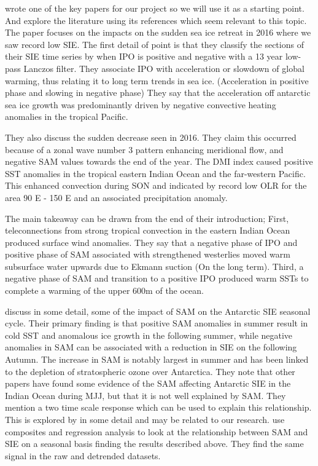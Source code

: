 \cite{Meehl2019Sustained2016} wrote one of the key papers for our project so we will use it as a starting point. And explore the literature using its references which seem relevant to this topic. The paper focuses on the impacts on the sudden sea ice retreat in 2016 where we saw record low SIE. The first detail of point is that they classify the sections of their SIE time series by when IPO is positive and negative with a 13 year low-pass Lanczos filter. They associate IPO with acceleration or slowdown of global warming, thus relating it to long term trends in sea ice. (Acceleration in positive phase and slowing in negative phase) They say that the acceleration off antarctic sea ice growth was predominantly driven by negative convective heating anomalies in the tropical Pacific.

They also discuss the sudden decrease seen in 2016. They claim this occurred because of a zonal wave number 3 pattern enhancing meridional flow, and negative SAM values towards the end of the year. The DMI index caused positive SST anomalies in the tropical eastern Indian Ocean and the far-western Pacific. This enhanced convection during SON and indicated by record low OLR for the area 90 E - 150 E and an associated precipitation anomaly.

The main takeaway can be drawn from the end of their introduction; First, teleconnections from strong tropical convection in the eastern Indian Ocean produced surface wind anomalies.
They say that a negative phase of IPO and positive phase of SAM associated with strengthened westerlies moved warm subsurface water upwards due to Ekmann suction (On the long term). Third, a negative phase of SAM and transition to a positive IPO produced warm SSTs to complete a warming of the upper 600m of the ocean.
\medskip

\cite{Doddridge2017ModulationMode} discuss in some detail, some of the impact of SAM on the Antarctic SIE seasonal cycle. Their primary finding is that positive SAM anomalies in summer result in cold SST and anomalous ice growth in the following summer, while negative anomalies in SAM can be associated with a reduction in SIE on the following Autumn. The increase in SAM is notably largest in summer and has been linked to the depletion of stratospheric ozone over Antarctica. They note that other papers have found some evidence of the SAM affecting Antarctic SIE in the Indian Ocean during MJJ, but that it is not well explained by SAM. They mention a two time scale response which can be used to explain this relationship. This is explored by \cite{FerreiraAntarcticProblem} in some detail and may be related to our research. \cite{Doddridge2017ModulationMode} use composites and regression analysis to look at the relationship between SAM and SIE on a seasonal basis finding the results described above. They find the same signal in the raw and detrended datasets.


